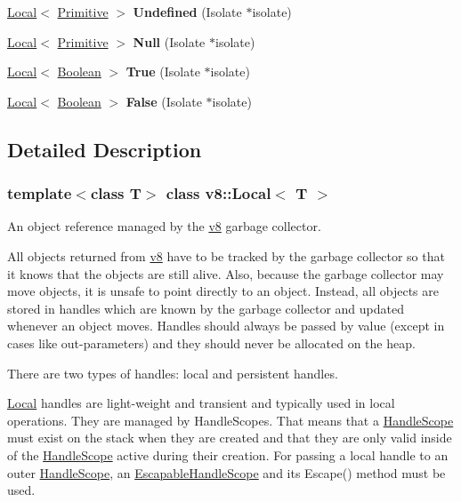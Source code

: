 \begin{DoxyCompactItemize}
\mbox{\hyperlink{classv8_1_1Local}{Local}}$<$ \mbox{\hyperlink{classv8_1_1Primitive}{Primitive}} $>$ {\bfseries Undefined} (Isolate $\ast$isolate)
\item 
\mbox{\label{classv8_1_1Local_a6a29184b023bde58d4af2bba2d249a35}} 
\mbox{\hyperlink{classv8_1_1Local}{Local}}$<$ \mbox{\hyperlink{classv8_1_1Primitive}{Primitive}} $>$ {\bfseries Null} (Isolate $\ast$isolate)
\item 
\mbox{\label{classv8_1_1Local_aa5944f05409b5572b14793eff33a7908}} 
\mbox{\hyperlink{classv8_1_1Local}{Local}}$<$ \mbox{\hyperlink{classv8_1_1Boolean}{Boolean}} $>$ {\bfseries True} (Isolate $\ast$isolate)
\item 
\mbox{\label{classv8_1_1Local_ae8e414a3a8b3e1f2fa60c24e4dda0c4a}} 
\mbox{\hyperlink{classv8_1_1Local}{Local}}$<$ \mbox{\hyperlink{classv8_1_1Boolean}{Boolean}} $>$ {\bfseries False} (Isolate $\ast$isolate)
\end{DoxyCompactItemize}


\subsection{Detailed Description}
\subsubsection*{template$<$class T$>$\newline
class v8\+::\+Local$<$ T $>$}

An object reference managed by the \mbox{\hyperlink{namespacev8}{v8}} garbage collector.

All objects returned from \mbox{\hyperlink{namespacev8}{v8}} have to be tracked by the garbage collector so that it knows that the objects are still alive. Also, because the garbage collector may move objects, it is unsafe to point directly to an object. Instead, all objects are stored in handles which are known by the garbage collector and updated whenever an object moves. Handles should always be passed by value (except in cases like out-\/parameters) and they should never be allocated on the heap.

There are two types of handles\+: local and persistent handles.

\mbox{\hyperlink{classv8_1_1Local}{Local}} handles are light-\/weight and transient and typically used in local operations. They are managed by Handle\+Scopes. That means that a \mbox{\hyperlink{classv8_1_1HandleScope}{Handle\+Scope}} must exist on the stack when they are created and that they are only valid inside of the \mbox{\hyperlink{classv8_1_1HandleScope}{Handle\+Scope}} active during their creation. For passing a local handle to an outer \mbox{\hyperlink{classv8_1_1HandleScope}{Handle\+Scope}}, an \mbox{\hyperlink{classv8_1_1EscapableHandleScope}{Escapable\+Handle\+Scope}} and its Escape() method must be used.

